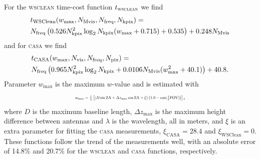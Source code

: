 \documentclass[useAMS,usenatbib]{mn2e}
\begin{document}
For the \textsc{wsclean} time-cost function $t_\textrm{\textsc{wsclean}}$ we find 
\begin{align}\label{eq:wsclean-computing-cost}
& t_\textrm{WSClean} (w_{\max},N_\textrm{Mvis},N_\textrm{freq},N_\textrm{kpix}) = \\ \notag%
& N_\textrm{freq} \left( 0.526 N_\textrm{kpix}^2 \log_2 N_\textrm{kpix} (w_{\max} + 0.715) + 0.535 \right) + 0.248 N_\textrm{Mvis}
\end{align}
and for \textsc{casa} we find
\begin{align}\label{eq:casa-computing-cost}
& t_\textrm{CASA}(w_{\max},N_\textrm{vis},N_\textrm{freq},N_\textrm{pix}) = \\ \notag%
& N_\textrm{freq} \left(0.965 N_\textrm{kpix}^2 \log_2 N_\textrm{kpix} + 0.0106 N_\textrm{Mvis} (w_{\max}^2 + 40.1)\right) + 40.8.
\label{eq:casa-computing-cost}%
\end{align}
Parameter $w_{\max}$ is the maximum $w$-value and is estimated with
\begin{equation}\resizebox{0.45\textwidth}{!}{$
 w_{\max} = \frac{1}{\lambda}\left[(D \sin \textrm{ZA} + \Delta z_{\max} \cos \textrm{ZA} + \xi) \left(1.0 - \cos(\frac{1}{2}\textrm{FOV})\right)\right]$},
\end{equation}%
where $D$ is the maximum baseline length, $\Delta z_{\max}$ is the maximum height difference between antennas and $\lambda$ is the wavelength, all in meters, and $\xi$ is an extra parameter for fitting the \textsc{casa} measurements, $\xi_\textrm{CASA}=28.4$ and $\xi_\textrm{WSClean}=0$. These functions follow the trend of the measurements well, with an absolute error of 14.8\% and 20.7\% for the \textsc{wsclean} and \textsc{casa} functions, respectively.
\end{document}
